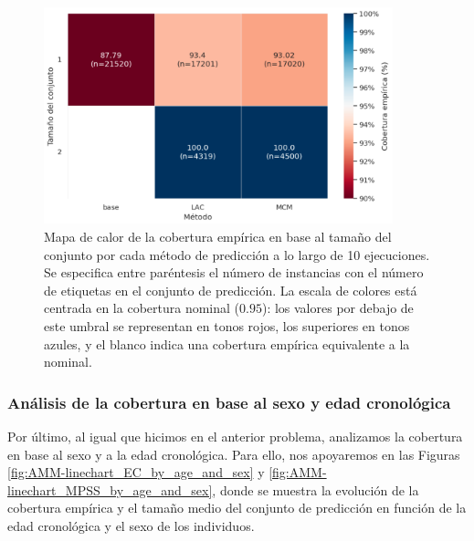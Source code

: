 \begin{figure}[h]
    \centering
    \includegraphics[width=0.9\textwidth]{capitulos/cap_05/imagenes/AMM-heatmap_EC_by_PSS.png}
    \caption[
        Problema de estimación de la mayoría de edad: 
        Mapa de calor de la cobertura empírica en base al tamaño del conjunto por cada método de predicción a lo largo de 10 ejecuciones.
    ]{
        Mapa de calor de la cobertura empírica en base al tamaño del conjunto por cada método de predicción a lo largo de 10 ejecuciones.
        Se especifica entre paréntesis el número de instancias con el número de etiquetas en el conjunto de predicción.
        La escala de colores está centrada en la cobertura nominal ($0.95$): los valores por debajo de este umbral se representan en tonos rojos, los superiores en tonos azules, y el blanco indica una cobertura empírica equivalente a la nominal.
    }
    \label{fig:AMM-heatmap_EC_by_PSS}
\end{figure}

\FloatBarrier


\subsubsection{Análisis de la cobertura en base al sexo y edad cronológica}

Por último, al igual que hicimos en el anterior problema, analizamos la cobertura en base al sexo y a la edad cronológica. Para ello, nos apoyaremos en las Figuras \ref{fig:AMM-linechart_EC_by_age_and_sex} y \ref{fig:AMM-linechart_MPSS_by_age_and_sex}, donde se muestra la evolución de la cobertura empírica y el tamaño medio del conjunto de predicción en función de la edad cronológica y el sexo de los individuos.

